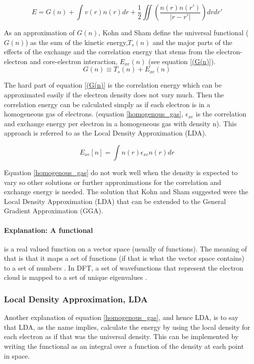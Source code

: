 \documentclass[12pt,a4paper]{article}
\begin{document}
\begin{equation} \label{Kohn_hohenberg}
E = G(n) + \int v(r) n(r) dr + \frac{1}{2} \iint (\frac{n(r) n(r')}{|r-r'|})dr dr'
\end{equation}

As an approximation of $G(n)$, Kohn and Sham define the universal functional ($G(n)$) as the sum of the kinetic energy,$T_s(n)$ and the major parts of the effects of the exchange and the correlation energy that stems from the electron-electron and core-electron interaction, $E_{xe}(n)$ (see equation \ref{(G(n)}).
\begin{equation} \label{(G(n)}
G(n) \equiv T_s(n) + E_{xc}(n)
\end{equation}


The hard part of equation \ref{(G(n)} is the correlation energy which can be approximated easily if the electron density does not vary much. Then the correlation energy can be calculated simply as if each electron is in a homogeneous gas of electrons. (equation \ref{homogenous_gas}, $\epsilon_{xc}$ is the correlation and exchange energy per electron in a homogeneous gas with density n). This approach is referred to as the Local Density Approximation (LDA).

\begin{equation} \label{homogenous_gas}
E_{xe}[n] = \int n(r)\epsilon_{xc} n(r) dr 
\end{equation}

Equation \ref{homogenous_gas} do not work well when the density is expected to vary so other solutions or further approximations for the correlation and exchange energy is needed. The solution that Kohn and Sham suggested were the Local Density Approximation (LDA) that can be extended to the General Gradient Approximation (GGA).
\cite{Kohn_and_Hohenberg64}\cite{Kohn_and_Sham65}

\paragraph{Explanation: A functional} is a real valued function on a vector space (usually of functions). The meaning of that is that it maps a set of functions (if that is what the vector space contains) to a set of numbers \cite{functional}. In DFT, a set of wavefunctions that represent the electron cloud is mapped to a set of unique eigenvalues \cite{burke} .




\subsubsection{Local Density Approximation, LDA}
Another explanation of equation \ref{homogenous_gas}, and hence LDA, is to say that LDA, as the name implies, calculate the energy by using the local density for each electron as if that was the universal density. This can be implemented by writing the functional as an integral over a function of the density at each point in space.
\end{document}

